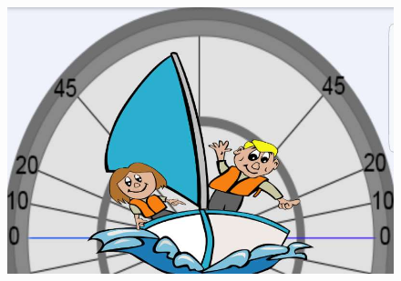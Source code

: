 \begin{figure}[H] 
 	\centering
	\begin{minipage}[c]{0.6\textwidth}
	\includegraphics[width=\textwidth]{Figures/incline.jpg}
	\label{feedback-incline}
	\end{minipage}
	~
	\begin{minipage}[c]{.3\textwidth}

\end{minipage}
\end{figure}
